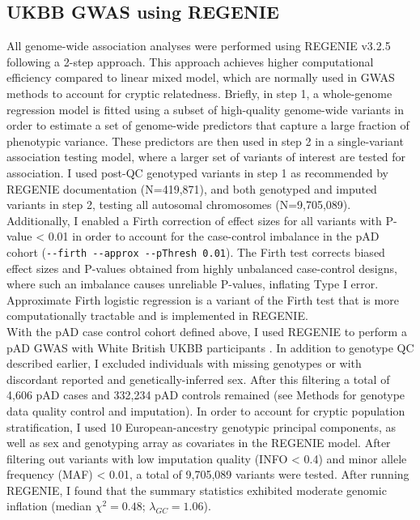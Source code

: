 \subsection{UKBB GWAS using REGENIE}
All genome-wide association analyses were performed using REGENIE v3.2.5 \cite{Mbatchou2021-qm} following a 2-step approach. This approach achieves higher computational efficiency compared to linear mixed model, which are normally used in GWAS methods to account for cryptic relatedness. Briefly, in step 1, a whole-genome regression model is fitted using a subset of high-quality genome-wide variants in order to estimate a set of genome-wide predictors that capture a large fraction of phenotypic variance. These predictors are then used in step 2 in a single-variant association testing model, where a larger set of variants of interest are tested for association. I used post-QC genotyped variants in step 1 as recommended by REGENIE documentation (N=419,871), and both genotyped and imputed variants in step 2, testing all autosomal chromosomes (N=9,705,089). Additionally, I enabled a Firth correction of effect sizes for all variants with P-value < 0.01 in order to account for the case-control imbalance in the pAD cohort (\Verb+--firth --approx --pThresh 0.01+). The Firth test corrects biased effect sizes and P-values obtained from highly unbalanced case-control designs, where such an imbalance causes unreliable P-values, inflating Type I error. Approximate Firth logistic regression is a variant of the Firth test that is more computationally tractable and is implemented in REGENIE. \\

With the pAD case control cohort defined above, I used REGENIE to perform a pAD GWAS with White British UKBB participants \cite{Mbatchou2021-qm}. In addition to genotype QC described earlier, I  excluded individuals with missing genotypes or with discordant reported and genetically-inferred sex. After this filtering a total of 4,606 pAD cases and 332,234 pAD controls remained (see Methods for genotype data quality control and imputation). In order to account for cryptic population stratification, I used 10 European-ancestry genotypic principal components, as well as sex and genotyping array as covariates in the REGENIE model. After filtering out variants with low imputation quality (INFO < 0.4) and minor allele frequency (MAF) < 0.01, a total of 9,705,089 variants were tested. After running REGENIE, I found that the summary statistics exhibited moderate genomic inflation (median $\chi^{2}=0.48$; $\lambda_{GC}=1.06$). 
  

